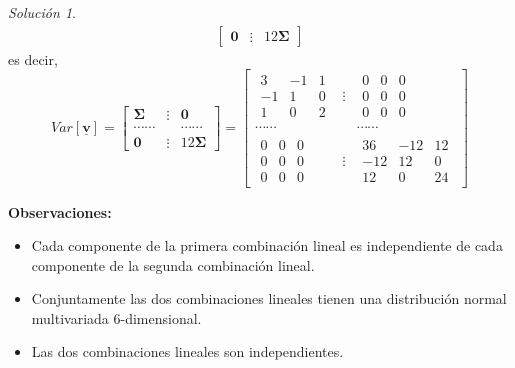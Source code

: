 \documentclass[
]{book}
\theoremstyle{definition}
\theoremstyle{definition}
\theoremstyle{definition}
\theoremstyle{definition}
\theoremstyle{remark}
\newtheorem*{solution}{Solución}
\begin{document}
\begin{solution}
\begin{align*}
\begin{bmatrix}
\mathbf{0} & \vdots & 12\mathbf{\Sigma}
\end{bmatrix}
\end{align*}
es decir,
\[
Var [\underline{\mathbf{v}}]= \begin{bmatrix}
\mathbf{\Sigma} & \vdots &  \mathbf{0} \\
\cdots\cdots & & \cdots\cdots \\
\mathbf{0} & \vdots & 12 \mathbf{\Sigma}
\end{bmatrix}=\begin{bmatrix}
\begin{matrix}
3 & -1 & 1\\ -1 & 1 &0 \\ 1 & 0& 2
\end{matrix} & \vdots &  \begin{matrix}
0 & 0 & 0\\ 0 & 0 &0 \\ 0 & 0& 0
\end{matrix} \\
\cdots\cdots & & \cdots\cdots \\
\begin{matrix}
0 & 0 & 0\\ 0 & 0 &0 \\ 0 & 0& 0
\end{matrix} & \vdots & \begin{matrix}
36 & -12 & 12\\ -12 & 12 &0 \\ 12 & 0& 24
\end{matrix}
\end{bmatrix}
\]

\end{solution}

\textbf{Observaciones:}

\begin{itemize}
\item
  Cada componente de la primera combinación lineal es
  independiente de cada componente de la segunda
  combinación lineal.
\item
  Conjuntamente las dos combinaciones lineales tienen una
  distribución normal multivariada 6-dimensional.
\item
  Las dos combinaciones lineales son independientes.
\end{itemize}
\end{document}
